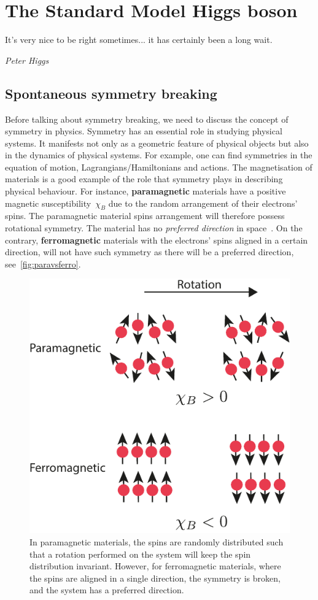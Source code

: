 \chapter{The Standard Model Higgs boson }\label{chap:HiggsSM}
\epigraph{	It's very nice to be right sometimes... it has certainly been a long wait.}{\textit{Peter Higgs }}

\section{Spontaneous symmetry breaking}
\par Before talking about symmetry breaking, we need to discuss the concept of symmetry in physics. Symmetry has an essential role in studying physical systems. It manifests not only as a geometric feature of physical objects but also in the dynamics of physical systems. For example, one can find symmetries in the equation of motion, Lagrangians/Hamiltonians and actions. The magnetisation of materials is a good example of the role that symmetry plays in describing physical behaviour. For instance, \textbf{paramagnetic} materials have a positive magnetic susceptibility~$\chi_B$ due to the random arrangement of their electrons' spins.  The paramagnetic material spins arrangement will therefore possess rotational symmetry. The material has no \textit{ preferred direction} in space~\cite{minlos2000introduction}. On the contrary, \textbf{ferromagnetic} materials with the electrons' spins aligned in a certain direction, will not have such symmetry as there will be a preferred direction, see~\autoref{fig:paravsferro}. 
\begin{figure}[htpb!]
    \centering  
   \includegraphics[width=0.36\linewidth]{./figures/ferrvspara}
    \caption{In paramagnetic materials, the spins are randomly distributed such that a rotation performed on the system will keep the spin distribution invariant. However, for ferromagnetic materials, where the spins are aligned in a single direction, the symmetry is broken, and the system has a preferred direction.}  \label{fig:paravsferro}
\end{figure}
